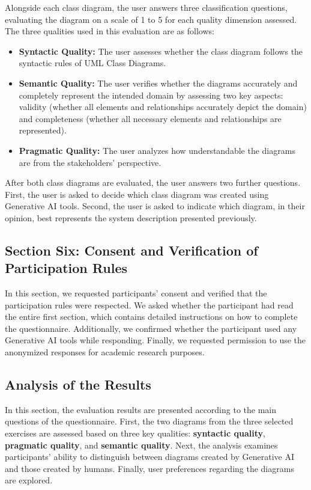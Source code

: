 Alongside each class diagram, the user answers three classification questions, evaluating the diagram on a scale of 1 to 5 for each quality dimension assessed. 
The three qualities used in this evaluation are as follows:

\begin{itemize}
    \item \textbf{Syntactic Quality:} The user assesses whether the class diagram follows 
    the syntactic rules of UML Class Diagrams.
    \item \textbf{Semantic Quality:} The user verifies whether the diagrams accurately and completely represent the intended domain by assessing two key aspects: validity (whether all elements and relationships accurately depict the domain) and completeness (whether all necessary elements and relationships are represented).
        
    \item \textbf{Pragmatic Quality:} The user analyzes how understandable the diagrams 
    are from the stakeholders' perspective.
\end{itemize}

After both class diagrams are evaluated, the user answers two further questions. 
First, the user is asked to decide which class diagram was created using Generative 
AI tools. Second, the user is asked to indicate which diagram, in their opinion, best 
represents the system description presented previously.

\subsection{Section Six: Consent and Verification of Participation Rules}

In this section, we requested participants' consent and verified that the participation 
rules were respected. We asked whether the participant had read the entire first 
section, which contains detailed instructions on how to complete the questionnaire. 
Additionally, we confirmed whether the participant used any Generative AI tools 
while responding. Finally, we requested permission to use the anonymized responses 
for academic research purposes.


\subsection{Analysis of the Results}
In this section, the evaluation results are presented according to the main 
questions of the questionnaire. First, the two diagrams from the three selected 
exercises are assessed based on three key qualities: \textbf{syntactic quality}, 
\textbf{pragmatic quality}, and \textbf{semantic quality}. Next, the analysis examines 
participants' ability to distinguish between diagrams created by Generative AI 
and those created by humans. Finally, user preferences regarding the diagrams 
are explored.

